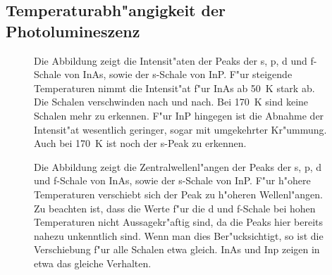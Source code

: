 \subsection{Temperaturabh"angigkeit der Photolumineszenz}
\begin{sidewaysfigure}
    
    \caption{
        Spektrum der InAs QDs f"ur verschiedene Temperaturen $T$.
        Es sind bis zu vier Peaks zu erkennen, die von rechts nach links der s, p, d und f-Schale im atom"ahnlichen Modell entsprechen.
        Die Kreuze bezeichnen die Messpunkte, w"ahrend die durchgezogenen Linien Gau\ss-Fits nach Gleichung \eqref{eq:fit} sind.
        Wenn die Temperatur erh"oht wird sinkt nicht nur die H"ohe der Peaks sondern sie werden auch zu h"oheren Wellenl"angen (niedrigeren Energien) verschoben.
    }
    \label{fig:InAs_temp}
\end{sidewaysfigure}
\begin{sidewaysfigure}
    
    \caption{
        Spektrum der InP QDs f"ur verschiedene Temperaturen $T$.
        Der linke Peak entspricht der s-Schale.
        Die Kreuze bezeichnen die Messpunkte, w"ahrend die durchgezogenen Linien Gau\ss-Fits nach Gleichung \eqref{eq:fit} sind.
        Beim Fit wird nur der Bereich bis \SI{780}{\nano\metre} verwendet.
        F"ur steigende Temperaturen nehmen die Peaks ab und werden zu h"oheren Wellenl"angen (niedrigeren Energien) verschoben.
        Die rechten Peaks verschwimmen immer mehr.
    }
    \label{fig:InP_temp}
\end{sidewaysfigure}
\begin{figure}[htbp]
    \centering
    
    \caption{
        Die Abbildung zeigt die Intensit"aten der Peaks der s, p, d und f-Schale von InAs, sowie der s-Schale von InP.
        F"ur steigende Temperaturen nimmt die Intensit"at f"ur InAs ab \SI{50}{\kelvin} stark ab.
        Die Schalen verschwinden nach und nach.
        Bei \SI{170}{\kelvin} sind keine Schalen mehr zu erkennen.
        F"ur InP hingegen ist die Abnahme der Intensit"at wesentlich geringer, sogar mit umgekehrter Kr"ummung.
        Auch bei \SI{170}{\kelvin} ist noch der s-Peak zu erkennen.
    }
    \label{fig:overtemp}
\end{figure}
\begin{figure}[htbp]
    \centering
    
    \caption{
        Die Abbildung zeigt die Zentralwellenl"angen der Peaks der s, p, d und f-Schale von InAs, sowie der s-Schale von InP.
        F"ur h"ohere Temperaturen verschiebt sich der Peak zu h"oheren Wellenl"angen.
        Zu beachten ist, dass die Werte f"ur die d und f-Schale bei hohen Temperaturen nicht Aussagekr"aftig sind, da die Peaks hier bereits nahezu unkenntlich sind.
        Wenn man dies Ber"ucksichtigt, so ist die Verschiebung f"ur alle Schalen etwa gleich.
        InAs und Inp zeigen in etwa das gleiche Verhalten.
    }
    \label{fig:mu_overtemp}
\end{figure}

